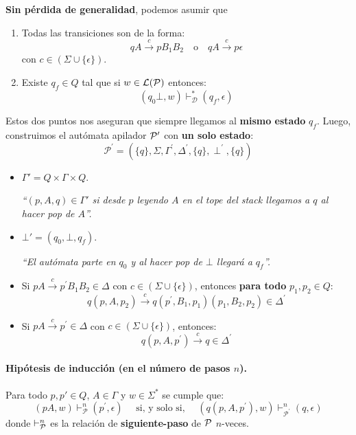\textbf{Sin pérdida de generalidad}, podemos asumir que
\begin{enumerate}
    \item Todas las transiciones son de la forma:
          $$
              q A \stackrel{c}{\rightarrow} p B_1 B_2 \quad \text{o} \quad q A \stackrel{c}{\rightarrow} p \epsilon
          $$
          con $c \in (\Sigma \cup \{\epsilon\})$.
    \item Existe $q_f \in Q$ tal que si $w \in \mathcal{L}(\mathcal{P})$ entonces:
          $$
              \left(q_0 \bot, w\right) \vdash_{\mathcal{D}}^*\left(q_f, \epsilon\right)
          $$
\end{enumerate}
Estos dos puntos nos aseguran  que siempre llegamos al \textbf{mismo estado} $q_f$. Luego, construimos el autómata apilador $\mathcal{P}'$ con \textbf{un solo estado}:
$$
    \mathcal{P}^{\prime}=\left(\{q\}, \Sigma, \Gamma^{\prime}, \Delta^{\prime},\{q\}, \perp^{\prime},\{q\}\right)
$$
\begin{itemize}
    \item $\Gamma'= Q\times \Gamma \times Q$.

          \textit{``$(p, A, q) \in \Gamma'$ si desde $p$ leyendo $A$ en el tope del stack llegamos a $q$ al hacer pop de $A$''.}

    \item $\bot' = (q_0,\bot, q_f)$.

          \textit{``El autómata parte en $q_0$ y al hacer pop de $\bot$ llegará a $q_f$''.}

    \item Si $p A \stackrel{c}{\rightarrow} p^{\prime} B_1 B_2 \in \Delta$ con $c \in (\Sigma \cup \{\epsilon\})$, entonces \textbf{para todo} $p_1,p_2 \in Q$:
          $$
              q\left(p, A, p_2\right) \stackrel{c}{\rightarrow} q\left(p^{\prime}, B_1, p_1\right)\left(p_1, B_2, p_2\right) \in \Delta^{\prime}
          $$

    \item Si $p A \stackrel{c}{\rightarrow} p^{\prime}\in \Delta$ con $c \in (\Sigma \cup \{\epsilon\})$, entonces:
          $$
              q\left(p, A, p^{\prime}\right) \stackrel{c}{\rightarrow} q \in \Delta^{\prime}
          $$
\end{itemize}

\paragraph{Hipótesis de inducción (en el número de pasos $n$).} Para todo $p,p' \in Q$, $A \in \Gamma$ y $w \in \Sigma^*$ se cumple que:
$$
    (p A, w) \vdash_{\mathcal{P}}^n\left(p^{\prime}, \epsilon\right) \quad \text { si, y solo si, } \quad\left(q\left(p, A, p^{\prime}\right), w\right) \vdash_{\mathcal{P}^{\prime}}^n(q, \epsilon)
$$
donde $\vdash_{\mathcal{P}}^n$ es la relación de \textbf{siguiente-paso} de $\mathcal{P}$ $n$-veces. \medbreak

